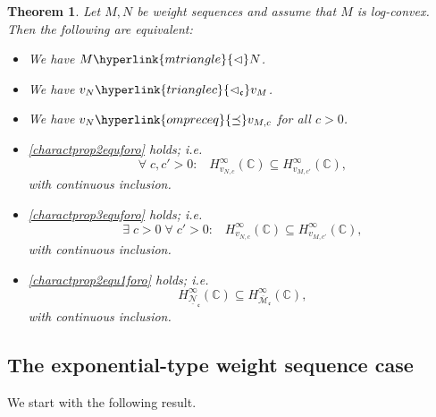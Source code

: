 \documentclass[10pt]{amsart}%
\numberwithin{equation}{section}
\theoremstyle{plain}
\newtheorem{theorem}[proposition]{Theorem}
\newcommand{\CC}{\mathbb{C}}
\begin{document}
\begin{theorem}\label{littleoweightsequcharact}
	Let $M,N$ be weight sequences and assume that $M$ is log-convex. Then the following are equivalent:
	\begin{itemize}
		\item[$(i)$] We have $M\hyperlink{mtriangle}{\vartriangleleft}N$.
		
		\item[$(ii)$] We have $v_N\hyperlink{trianglec}{\vartriangleleft_{\mathfrak{c}}}v_M$.
		
		\item[$(iii)$] We have $v_N\hyperlink{ompreceq}{\preceq}v_{M,c}$ for all $c>0$.
		
		\item[$(iv)$] \eqref{charactprop2equforo} holds; i.e.
		$$\forall\;c,c'>0:\;\;\;H^{\infty}_{v_{N,c}}(\CC)\subseteq H^{\infty}_{v_{M,c'}}(\CC),$$
		with continuous inclusion.
		
		\item[$(v)$] \eqref{charactprop3equforo} holds; i.e.
		$$\exists\;c>0\;\forall\;c'>0:\;\;\;H^{\infty}_{v_{N,c}}(\CC)\subseteq H^{\infty}_{v_{M,c'}}(\CC),$$
		with continuous inclusion.
		
		\item[$(vi)$] \eqref{charactprop2equ1foro} holds; i.e.
		$$H^{\infty}_{\underline{\mathcal{N}}_{\mathfrak{c}}}(\CC)\subseteq H^{\infty}_{\overline{\mathcal{M}}_{\mathfrak{c}}}(\CC),$$
		with continuous inclusion.
	\end{itemize}
\end{theorem}

\subsection{The exponential-type weight sequence case}
We start with the following result.
\end{document}
